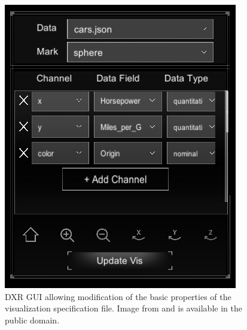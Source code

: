 \documentclass{vgtc}                          %
\begin{document}
\begin{figure}[tb]
	\centering
	\includegraphics[width=\columnwidth]{dxr_gui}
    \caption{DXR GUI allowing modification of the basic properties of the visualization specification file.
    Image from \cite{dxr:repo} and is available in the public domain.}
	\label{fig:dxr_gui}
\end{figure}

\medskip
\end{document}
